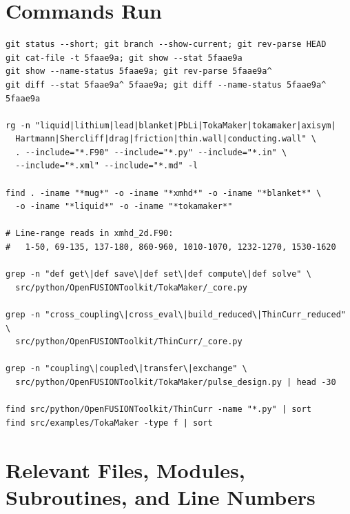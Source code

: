 \documentclass[11pt,letterpaper]{article}
\begin{document}
\appendix
\section{Commands Run}

\begin{verbatim}
git status --short; git branch --show-current; git rev-parse HEAD
git cat-file -t 5faae9a; git show --stat 5faae9a
git show --name-status 5faae9a; git rev-parse 5faae9a^
git diff --stat 5faae9a^ 5faae9a; git diff --name-status 5faae9a^ 5faae9a

rg -n "liquid|lithium|lead|blanket|PbLi|TokaMaker|tokamaker|axisym|
  Hartmann|Shercliff|drag|friction|thin.wall|conducting.wall" \
  . --include="*.F90" --include="*.py" --include="*.in" \
  --include="*.xml" --include="*.md" -l

find . -iname "*mug*" -o -iname "*xmhd*" -o -iname "*blanket*" \
  -o -iname "*liquid*" -o -iname "*tokamaker*"

# Line-range reads in xmhd_2d.F90:
#   1-50, 69-135, 137-180, 860-960, 1010-1070, 1232-1270, 1530-1620

grep -n "def get\|def save\|def set\|def compute\|def solve" \
  src/python/OpenFUSIONToolkit/TokaMaker/_core.py

grep -n "cross_coupling\|cross_eval\|build_reduced\|ThinCurr_reduced" \
  src/python/OpenFUSIONToolkit/ThinCurr/_core.py

grep -n "coupling\|coupled\|transfer\|exchange" \
  src/python/OpenFUSIONToolkit/TokaMaker/pulse_design.py | head -30

find src/python/OpenFUSIONToolkit/ThinCurr -name "*.py" | sort
find src/examples/TokaMaker -type f | sort
\end{verbatim}

\section{Relevant Files, Modules, Subroutines, and Line Numbers}
\end{document}
